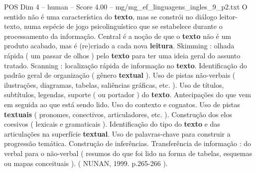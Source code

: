 \begin{textsample}{POS Dim 4 – human – Score 4.00 – mg/mg\_ef\_linguagens\_ingles\_9\_p2.txt}  \label{ex:f4_pos_019}
O sentido não é uma característica do \textbf{texto}, mas se constrói no diálogo leitor-texto, numa espécie de jogo psicolinguístico que se estabelece durante o processamento da informação.
Central é a noção de que o \textbf{texto} não é um produto acabado, mas é (re)criado a cada nova \textbf{leitura}.
Skimming : olhada rápida ( um passar de olhos ) pelo \textbf{texto} para ter uma ideia geral do assunto tratado.
Scanning : localização rápida de informação no \textbf{texto}.
Identificação do padrão geral de organização ( gênero \textbf{textual} ).
Uso de pistas não-verbais ( ilustrações, diagramas, tabelas, saliências gráficas, etc. ).
Uso de títulos, subtítulos, legendas, suporte ( ou portador ) do \textbf{texto}.
Antecipações do que vem em seguida ao que está sendo lido.
Uso do contexto e cognatos.
Uso de pistas \textbf{textuais} ( pronomes, conectivos, articuladores, etc. ).
Construção dos elos coesivos ( lexicais e gramaticais ).
Identificação do tipo do \textbf{texto} e das articulações na superfície \textbf{textual}.
Uso de palavras-chave para construir a progressão temática.
Construção de inferências.
Transferência de informação : do verbal para o não-verbal ( resumos do que foi lido na forma de tabelas, esquemas ou mapas conceituais ). ( NUNAN, 1999. p.265-266 ).

\end{textsample}
